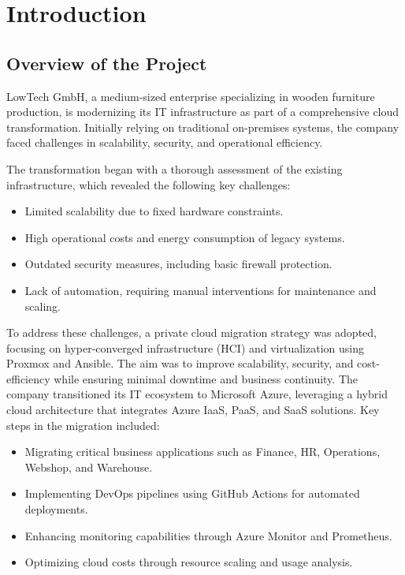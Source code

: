 \documentclass{llncs}
\begin{document}
\section{Introduction}
\subsection{Overview of the Project}
LowTech GmbH, a medium-sized enterprise specializing in wooden furniture production, is modernizing its IT infrastructure as part of a comprehensive cloud transformation. Initially relying on traditional on-premises systems, the company faced challenges in scalability, security, and operational efficiency.

The transformation began with a thorough assessment of the existing infrastructure, which revealed the following key challenges:
\begin{itemize}
    \item Limited scalability due to fixed hardware constraints.
    \item High operational costs and energy consumption of legacy systems.
    \item Outdated security measures, including basic firewall protection.
    \item Lack of automation, requiring manual interventions for maintenance and scaling.
\end{itemize}

To address these challenges, a private cloud migration strategy was adopted, focusing on hyper-converged infrastructure (HCI) and virtualization using Proxmox and Ansible. The aim was to improve scalability, security, and cost-efficiency while ensuring minimal downtime and business continuity.
The company transitioned its IT ecosystem to Microsoft Azure, leveraging a hybrid cloud architecture that integrates Azure IaaS, PaaS, and SaaS solutions. Key steps in the migration included:
\begin{itemize}
    \item Migrating critical business applications such as Finance, HR, Operations, Webshop, and Warehouse.
    \item Implementing DevOps pipelines using GitHub Actions for automated deployments.
    \item Enhancing monitoring capabilities through Azure Monitor and Prometheus.
    \item Optimizing cloud costs through resource scaling and usage analysis.
\end{itemize}
\end{document}

